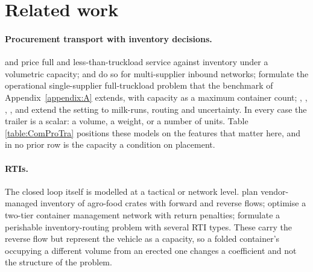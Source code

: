 \section{Related work}
\label{sec:lit}

\paragraph{Procurement transport with inventory decisions.}
\autocite{Berman2006InboundCost} and
\autocite{Sancak2011Multi-itemPolicy} price full and
less-than-truckload service against inventory under a volumetric
capacity; \autocite{Schoneberg2010AnNetworks} and
\autocite{Schoneberg2013ANetworks} do so for multi-supplier inbound
networks; \autocite{Diaz-Madronero2014APlanning} formulate the
operational single-supplier full-truckload problem that the benchmark
of Appendix~\ref{appendix:A} extends, with capacity as a maximum
container count; \autocite{Hein2016QuantitativeProblem},
\autocite{Diaz-Madronero2017ADecisions},
\autocite{Meyer2018TransportIndustry}, \autocite{Chitsaz2019ARouting},
\autocite{Baller2022OptimizingApproach} and
\autocite{Hashemi-Amiri2023IntegratedApproach} extend the setting to
milk-runs, routing and uncertainty. In every case the trailer is a
scalar: a volume, a weight, or a number of units. Table
\ref{table:ComProTra} positions these models on the features that
matter here, and in no prior row is the capacity a condition on
placement.

\paragraph{RTIs.}
The closed loop itself is modelled at a tactical or network level.
\autocite{SOYSAL2023101504} plan vendor-managed inventory of agro-food
crates with forward and reverse flows; \autocite{GUO2024104339}
optimise a two-tier container management network with return penalties;
\autocite{Zhang17012024} formulate a perishable inventory-routing
problem with several RTI types. These carry the reverse flow but
represent the vehicle as a capacity, so a folded container's occupying
a different volume from an erected one changes a coefficient and not
the structure of the problem.

